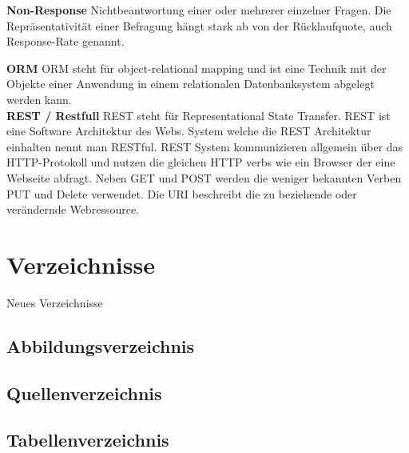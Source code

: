 \textbf{Non-Response} Nichtbeantwortung einer oder mehrerer einzelner
Fragen. Die Repräsentativität einer Befragung hängt stark ab von der
Rücklaufquote, auch Response-Rate genannt.

\textbf{ORM} ORM steht für object-relational mapping und ist eine
Technik mit der Objekte einer Anwendung in einem relationalen
Datenbanksystem abgelegt werden kann.\\

\textbf{REST / Restfull} REST steht für Representational State Transfer.
REST ist eine Software Architektur des Webs. System welche die REST
Architektur einhalten nennt man RESTful. REST System kommunizieren
allgemein über das HTTP-Protokoll und nutzen die gleichen HTTP verbs wie
ein Browser der eine Webseite abfragt. Neben GET und POST werden die
weniger bekannten Verben PUT und Delete verwendet. Die URI beschreibt
die zu beziehende oder verändernde Webressource.

\chapter{Verzeichnisse}\label{verzeichnisse}

Neues Verzeichnisse

\section{Abbildungsverzeichnis}\label{abbildungsverzeichnis}

\renewcommand{\listfigurename}{} 

\begingroup\let\clearpage\relax
\listoffigures
\endgroup

\pagebreak

\section{Quellenverzeichnis}\label{quellenverzeichnis}

\renewcommand{\bibname}{}

\begingroup \let\clearpage\relax
\printbibliography
\endgroup

\pagebreak

\section{Tabellenverzeichnis}\label{tabellenverzeichnis}

\renewcommand{\listtablename}{} 

\begingroup \let\clearpage\relax
\listoftables
\endgroup





